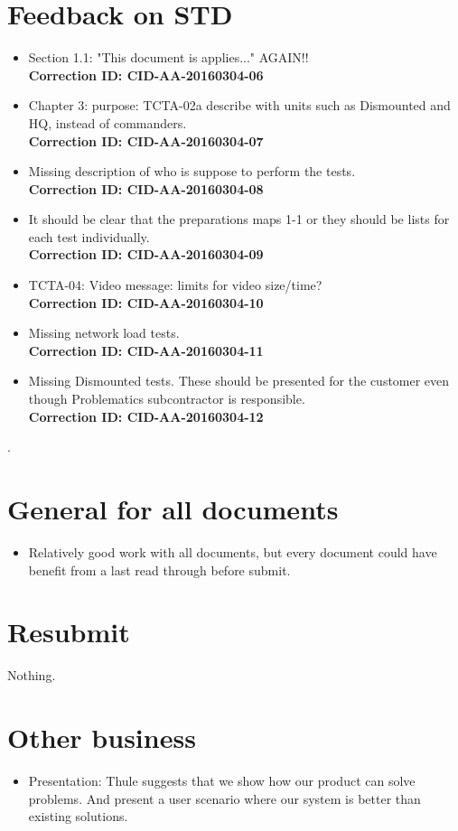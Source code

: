 \section*{Feedback on STD}
\begin{itemize}
    \item Section 1.1: "This document is applies..." AGAIN!!
    \\ \textbf{Correction ID: CID-AA-20160304-06}
    
    \item Chapter 3: purpose: TCTA-02a describe with units such as Dismounted and HQ, instead of commanders.
    \\ \textbf{Correction ID: CID-AA-20160304-07}
    
    \item Missing description of who is suppose to perform the tests.
    \\ \textbf{Correction ID: CID-AA-20160304-08}
    
    \item It should be clear that the preparations maps 1-1 or they should be lists for each test individually.
    \\ \textbf{Correction ID: CID-AA-20160304-09}
    
    \item TCTA-04: Video message: limits for video size/time?
    \\ \textbf{Correction ID: CID-AA-20160304-10}

    \item Missing network load tests.
    \\ \textbf{Correction ID: CID-AA-20160304-11}    
    
    \item Missing Dismounted tests. These should be presented for the customer even though Problematics subcontractor is responsible.
    \\ \textbf{Correction ID: CID-AA-20160304-12}
\end{itemize}.

\section*{General for all documents}
\begin{itemize}
    \item Relatively good work with all documents, but every document could have benefit from a last read through before submit.
\end{itemize}

\section*{Resubmit}
Nothing.

\section*{Other business}
\begin{itemize}
    \item Presentation: Thule suggests that we show how our product can solve problems. And present a user scenario where our system is better than existing solutions.
\end{itemize}


